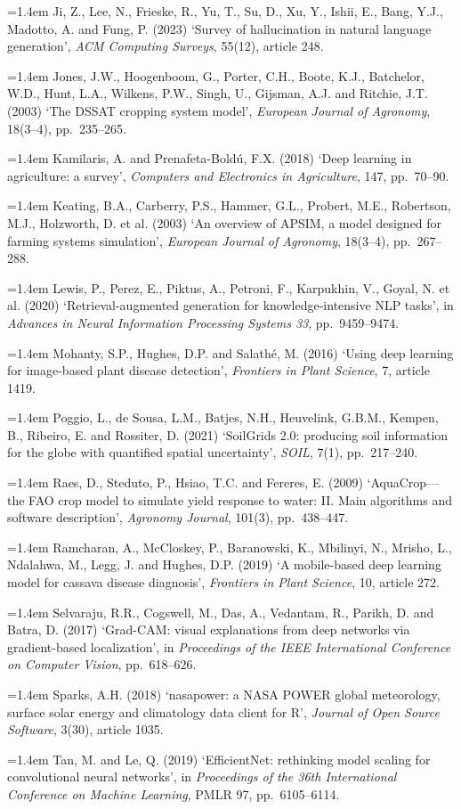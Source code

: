\documentclass[11pt,a4paper]{article}
\newcommand{\refitem}[1]{\par\noindent\hangindent=1.4em\hangafter=1 #1\par}
\begin{document}
\refitem{Ji, Z., Lee, N., Frieske, R., Yu, T., Su, D., Xu, Y., Ishii, E., Bang, Y.J., Madotto, A. and Fung, P. (2023) `Survey of hallucination in natural language generation', \textit{ACM Computing Surveys}, 55(12), article 248.}
\refitem{Jones, J.W., Hoogenboom, G., Porter, C.H., Boote, K.J., Batchelor, W.D., Hunt, L.A., Wilkens, P.W., Singh, U., Gijsman, A.J. and Ritchie, J.T. (2003) `The DSSAT cropping system model', \textit{European Journal of Agronomy}, 18(3--4), pp.\ 235--265.}
\refitem{Kamilaris, A. and Prenafeta-Boldú, F.X. (2018) `Deep learning in agriculture: a survey', \textit{Computers and Electronics in Agriculture}, 147, pp.\ 70--90.}
\refitem{Keating, B.A., Carberry, P.S., Hammer, G.L., Probert, M.E., Robertson, M.J., Holzworth, D. et al. (2003) `An overview of APSIM, a model designed for farming systems simulation', \textit{European Journal of Agronomy}, 18(3--4), pp.\ 267--288.}
\refitem{Lewis, P., Perez, E., Piktus, A., Petroni, F., Karpukhin, V., Goyal, N. et al. (2020) `Retrieval-augmented generation for knowledge-intensive NLP tasks', in \textit{Advances in Neural Information Processing Systems 33}, pp.\ 9459--9474.}
\refitem{Mohanty, S.P., Hughes, D.P. and Salathé, M. (2016) `Using deep learning for image-based plant disease detection', \textit{Frontiers in Plant Science}, 7, article 1419.}
\refitem{Poggio, L., de Sousa, L.M., Batjes, N.H., Heuvelink, G.B.M., Kempen, B., Ribeiro, E. and Rossiter, D. (2021) `SoilGrids 2.0: producing soil information for the globe with quantified spatial uncertainty', \textit{SOIL}, 7(1), pp.\ 217--240.}
\refitem{Raes, D., Steduto, P., Hsiao, T.C. and Fereres, E. (2009) `AquaCrop---the FAO crop model to simulate yield response to water: II. Main algorithms and software description', \textit{Agronomy Journal}, 101(3), pp.\ 438--447.}
\refitem{Ramcharan, A., McCloskey, P., Baranowski, K., Mbilinyi, N., Mrisho, L., Ndalahwa, M., Legg, J. and Hughes, D.P. (2019) `A mobile-based deep learning model for cassava disease diagnosis', \textit{Frontiers in Plant Science}, 10, article 272.}
\refitem{Selvaraju, R.R., Cogswell, M., Das, A., Vedantam, R., Parikh, D. and Batra, D. (2017) `Grad-CAM: visual explanations from deep networks via gradient-based localization', in \textit{Proceedings of the IEEE International Conference on Computer Vision}, pp.\ 618--626.}
\refitem{Sparks, A.H. (2018) `nasapower: a NASA POWER global meteorology, surface solar energy and climatology data client for R', \textit{Journal of Open Source Software}, 3(30), article 1035.}
\refitem{Tan, M. and Le, Q. (2019) `EfficientNet: rethinking model scaling for convolutional neural networks', in \textit{Proceedings of the 36th International Conference on Machine Learning}, PMLR 97, pp.\ 6105--6114.}
\end{document}
